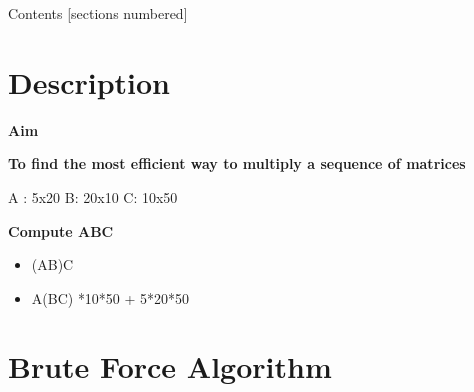 \documentclass[algorithm,pgfplots]{cuzbeamer}
\begin{document}
    
    \maketitle

    \begin{frame}{Contents}
        [sections numbered]
        \tableofcontents
    \end{frame}

    \section{Description}

    \begin{frame}
    \printbibliography
        \begin{block}{\large{\textbf{Aim}}}
            \begin{leftbar}
           \textbf{ To find the most efficient way to multiply a sequence of matrices}
            \end{leftbar}
        \end{block}
        A : 5x20 \hspace{1cm}  B: 20x10 \hspace{1cm} C: 10x50
    
    
    \begin{block}{\large{\textbf{Compute ABC}}}
    \begin{itemize}[(1)]
    
    \item<1->  (AB)C    
    \item<1->  A(BC)  {*10*50 + 5*20*50} 
    \end{itemize}
    \end{block}   
    
    \end{frame}

    \section{Brute Force Algorithm}
\end{document}
